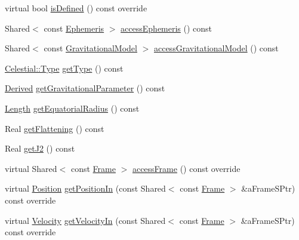 \begin{DoxyCompactItemize}
\item 
virtual bool \hyperlink{classlibrary_1_1physics_1_1env_1_1obj_1_1_celestial_a2b16a76f609891450356457de13c26d8}{is\+Defined} () const override
\item 
Shared$<$ const \hyperlink{classlibrary_1_1physics_1_1env_1_1_ephemeris}{Ephemeris} $>$ \hyperlink{classlibrary_1_1physics_1_1env_1_1obj_1_1_celestial_ab56fff3f2f1508dee79fa7410d67e300}{access\+Ephemeris} () const
\item 
Shared$<$ const \hyperlink{namespacelibrary_1_1physics_1_1env_1_1obj_ade509c84a4970a3420c03c058ada152a}{Gravitational\+Model} $>$ \hyperlink{classlibrary_1_1physics_1_1env_1_1obj_1_1_celestial_acbb834f37fa8f0fc7868d41ebb5173ee}{access\+Gravitational\+Model} () const
\item 
\hyperlink{classlibrary_1_1physics_1_1env_1_1obj_1_1_celestial_aab1f58aa727e639288d65f3d33c4f245}{Celestial\+::\+Type} \hyperlink{classlibrary_1_1physics_1_1env_1_1obj_1_1_celestial_ae020ad574249ea82679347c0a6933355}{get\+Type} () const
\item 
\hyperlink{classlibrary_1_1physics_1_1units_1_1_derived}{Derived} \hyperlink{classlibrary_1_1physics_1_1env_1_1obj_1_1_celestial_a2e8341c35d9c4c07eed4ce9aa5d9acc2}{get\+Gravitational\+Parameter} () const
\item 
\hyperlink{classlibrary_1_1physics_1_1units_1_1_length}{Length} \hyperlink{classlibrary_1_1physics_1_1env_1_1obj_1_1_celestial_a7dd4326ff317292262d1a9adf8887cfe}{get\+Equatorial\+Radius} () const
\item 
Real \hyperlink{classlibrary_1_1physics_1_1env_1_1obj_1_1_celestial_aac48ed47a25a10c120f066995dc3c6d4}{get\+Flattening} () const
\item 
Real \hyperlink{classlibrary_1_1physics_1_1env_1_1obj_1_1_celestial_a3740b398dca520bd50862f67c29ab8e7}{get\+J2} () const
\item 
virtual Shared$<$ const \hyperlink{classlibrary_1_1physics_1_1coord_1_1_frame}{Frame} $>$ \hyperlink{classlibrary_1_1physics_1_1env_1_1obj_1_1_celestial_a6649bfe0bf0795aa4def046a8c38aef5}{access\+Frame} () const override
\item 
virtual \hyperlink{classlibrary_1_1physics_1_1coord_1_1_position}{Position} \hyperlink{classlibrary_1_1physics_1_1env_1_1obj_1_1_celestial_aa2a209f37414e24303c21d994396664f}{get\+Position\+In} (const Shared$<$ const \hyperlink{classlibrary_1_1physics_1_1coord_1_1_frame}{Frame} $>$ \&a\+Frame\+S\+Ptr) const override
\item 
virtual \hyperlink{classlibrary_1_1physics_1_1coord_1_1_velocity}{Velocity} \hyperlink{classlibrary_1_1physics_1_1env_1_1obj_1_1_celestial_accaa3b1fdc39a1a058fd35006f31982d}{get\+Velocity\+In} (const Shared$<$ const \hyperlink{classlibrary_1_1physics_1_1coord_1_1_frame}{Frame} $>$ \&a\+Frame\+S\+Ptr) const override

\end{DoxyCompactItemize}
